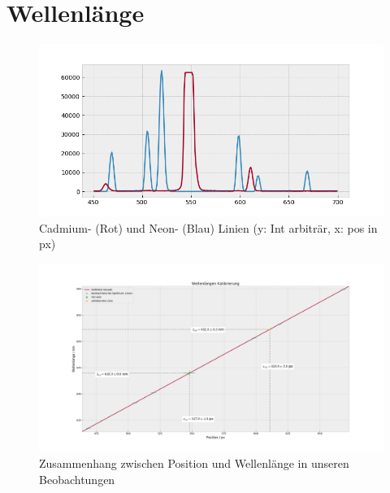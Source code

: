 
\section{Wellenlänge}
    \begin{myframe}{}
        \begin{figure}
            \centering
            \includegraphics[width=.8\paperwidth]{img/wl.png}
            \caption{Cadmium- (Rot) und Neon- (Blau) Linien (y: Int arbitr\"ar, x: pos in px)}
        \end{figure}
    \end{myframe}

    \begin{myframe}{}
        \begin{figure}
            \centering
            \includegraphics[width=.8\paperwidth]{img/wl_ne_cal}
            \caption{Zusammenhang zwischen Position und Wellenlänge in unseren Beobachtungen}
        \end{figure}
    \end{myframe}

